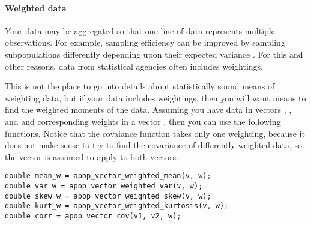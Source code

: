 \paragraph{\treesymbol{} Weighted data} Your data may be aggregated so
that one line of data represents multiple observations. For example,
sampling efficiency can be improved by sampling subpopulations
differently depending upon their expected variance \citep{sarndal:mass}.
For this and other reasons, data from statistical agencies often
includes weightings.

This is not the place to go into details about statistically sound means
of weighting data, but if your data includes weightings, then you will
want means to find the weighted moments of the data. Assuming you have
data in vectors , , and  and corresponding weights in a vector
, then you can use the following functions. Notice that the
covaiance function takes only one weighting, because it does not make
sense to try to find the covariance of differently-weighted data, so the
 vector is assumed to apply to both vectors.
 
 
\begin{lstlisting}
double mean_w = apop_vector_weighted_mean(v, w);
double var_w = apop_vector_weighted_var(v, w);
double skew_w = apop_vector_weighted_skew(v, w);
double kurt_w = apop_vector_weighted_kurtosis(v, w);
double corr = apop_vector_cov(v1, v2, w);
\end{lstlisting}


